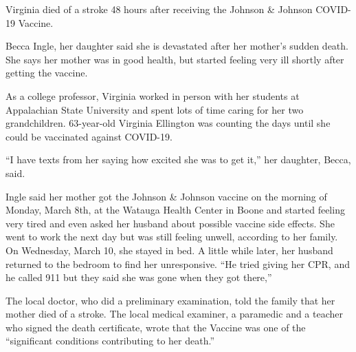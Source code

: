 Virginia died of a stroke 48 hours after receiving the Johnson \& Johnson
COVID-19 Vaccine.

Becca Ingle, her daughter said she is devastated after her mother’s sudden
death. She says her mother was in good health, but started feeling very ill
shortly after getting the vaccine.

As a college professor, Virginia worked in person with her students at
Appalachian State University and spent lots of time caring for her two
grandchildren. 63-year-old Virginia Ellington was counting the days until she
could be vaccinated against COVID-19.

“I have texts from her saying how excited she was to get it,” her daughter,
Becca, said.

Ingle said her mother got the Johnson \& Johnson vaccine on the morning of
Monday, March 8th, at the Watauga Health Center in Boone and started feeling
very tired and even asked her husband about possible vaccine side effects. She
went to work the next day but was still feeling unwell, according to her
family. On Wednesday, March 10, she stayed in bed. A little while later, her
husband returned to the bedroom to find her unresponsive. “He tried giving her
CPR, and he called 911 but they said she was gone when they got there,”

The local doctor, who did a preliminary examination, told the family that her
mother died of a stroke. The local medical examiner, a paramedic and a teacher
who signed the death certificate, wrote that the Vaccine was one of the
“significant conditions contributing to her death.”


